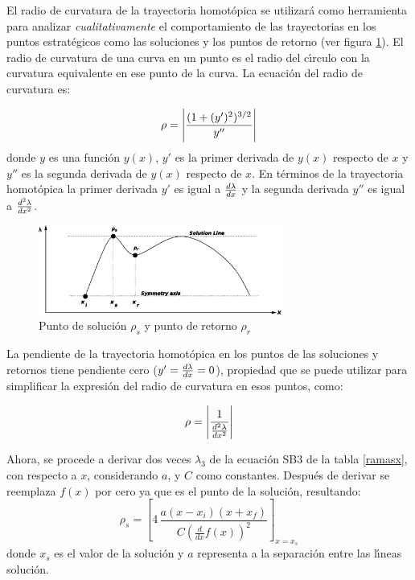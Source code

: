 \documentclass[conference,letterpaper,onecolumn]{IEEEtran}
\begin{document}
{El radio de curvatura de la trayectoria homot\'opica se utilizar\'a como herramienta para analizar {\it cualitativamente} 
el comportamiento
de las trayectorias en los puntos estrat\'egicos como las soluciones y los puntos de retorno (ver figura \ref{radio1}).
El radio de curvatura de una curva en un punto es el radio del c\'{\i}rculo con la curvatura equivalente en ese punto de la curva.
La ecuaci\'on del radio de curvatura es:

\begin{displaymath}
\rho=  \Bigg |{{(1 + (y')^2)^{3/2}} \over {y''}} \Bigg |
\end{displaymath}
donde $y$ es una funci\'on $y(x)$, $y'$ es la primer derivada de $y(x)$ respecto de $x$ y
$y''$ es la segunda derivada de $y(x)$ respecto de $x$. En t\'erminos de la trayectoria homot\'opica
la primer derivada $y'$ es igual a ${ {d \lambda} \over {dx}}$ y la segunda derivada $y''$ es igual a ${ {d^2 \lambda} \over {dx^2}}$.



\begin{figure}[hbtp]
\centering
\includegraphics[width=8cm]{figs/chap3/figs/radiob.eps}
\caption{Punto de soluci\'on $\rho_s$ y punto de retorno $\rho_r$}
\label{radio1}
\end{figure}


La pendiente de la trayectoria homot\'opica en los puntos de las soluciones y retornos tiene pendiente cero ($y'={ {d \lambda} \over {dx}} =0$),
propiedad que se puede utilizar para simplificar la expresi\'on del radio de curvatura en esos puntos, como:


\begin{displaymath}
\rho= \Bigg | {1 \over {{ {d^2 \lambda} \over {dx^2}}}} \Bigg |
\end{displaymath}



Ahora, se procede a derivar  dos veces $\lambda_3$ de la ecuaci\'on SB3 de la tabla \ref{ramasx}, con respecto a $x$, considerando $a$, y $C$ como
constantes. Despu\'es de derivar se reemplaza  $f(x)$ por cero ya que es
el punto de la soluci\'on, resultando:
\begin{displaymath}
\rho_{s}=\left[4\,{\frac {a \left( x-x_i \right)  \left( x+x_f \right) }{  C
   \left( {\frac {d}{dx}}f \left( x \right) \right)^{2}}}\right]_{x=x_s}
\end{displaymath}
donde $x_s$ es el valor de la soluci\'on y  $a$ representa a la separaci\'on entre las l\'{\i}neas soluci\'on.


}
\end{document}
